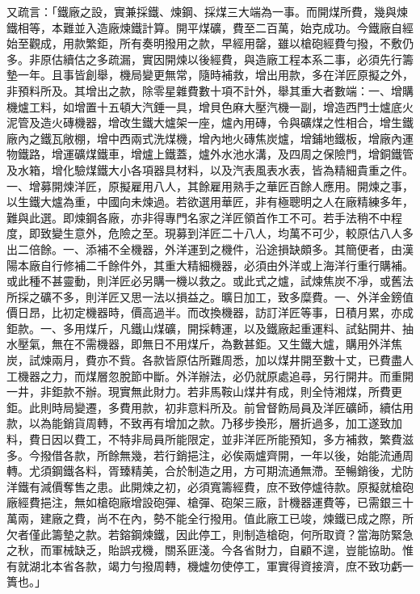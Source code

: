 \begin{pinyinscope}
又疏言：「鐵廠之設，實兼採鐵、煉鋼、採煤三大端為一事。而開煤所費，幾與煉鐵相等，本難並入造廠煉鐵計算。開平煤礦，費至二百萬，始克成功。今鐵廠自經始至觀成，用款繁鉅，所有奏明撥用之款，早經用罄，雖以槍砲經費勻撥，不敷仍多。非原估續估之多疏漏，實因開煉以後經費，與造廠工程本系二事，必須先行籌墊一年。且事皆創舉，機局變更無常，隨時補救，增出用款，多在洋匠原擬之外，非預料所及。其增出之款，除零星雜費數十項不計外，舉其重大者數端：一、增購機爐工料，如增置十五頓大汽錘一具，增貝色麻大壓汽機一副，增造西門士爐底火泥管及造火磚機器，增改生鐵大爐架一座，爐內用磚，令與礦煤之性相合，增生鐵廠內之鐵瓦敞棚，增中西兩式洗煤機，增內地火磚焦炭爐，增鋪地鐵板，增廠內運物鐵路，增運礦煤鐵車，增爐上鐵蓋，爐外水池水溝，及四周之保險門，增銅鐵管及水箱，增化驗煤鐵大小各項器具材料，以及汽表風表水表，皆為精細貴重之件。一、增募開煉洋匠，原擬雇用八人，其餘雇用熟手之華匠百餘人應用。開煉之事，以生鐵大爐為重，中國向未煉過。若欲選用華匠，非有極聰明之人在廠精練多年，難與此選。即煉鋼各廠，亦非得專門名家之洋匠領首作工不可。若手法稍不中程度，即致變生意外，危險之至。現募到洋匠二十八人，均萬不可少，較原估八人多出二倍餘。一、添補不全機器，外洋運到之機件，沿途損缺頗多。其簡便者，由漢陽本廠自行修補二千餘件外，其重大精細機器，必須由外洋或上海洋行重行購補。或此種不甚靈動，則洋匠必另購一機以救之。或此式之爐，試煉焦炭不凈，或舊法所採之礦不多，則洋匠又思一法以損益之。曠日加工，致多糜費。一、外洋金鎊值價日昂，比初定機器時，價高過半。而改換機器，訪訂洋匠等事，日積月累，亦成鉅款。一、多用煤斤，凡鐵山煤礦，開採轉運，以及鐵廠起重運料、試鉆開井、抽水壓氣，無在不需機器，即無日不用煤斤，為數甚鉅。又生鐵大爐，購用外洋焦炭，試煉兩月，費亦不貲。各款皆原估所難周悉，加以煤井開至數十丈，已費盡人工機器之力，而煤層忽脫節中斷。外洋辦法，必仍就原處追尋，另行開井。而重開一井，非鉅款不辦。現實無此財力。若非馬鞍山煤井有成，則全恃湘煤，所費更鉅。此則時局變遷，多費用款，初非意料所及。前曾督飭局員及洋匠礦師，續估用款，以為能銷貨周轉，不致再有增加之款。乃移步換形，層折過多，加工遂致加料，費日因以費工，不特非局員所能限定，並非洋匠所能預知，多方補救，繁費滋多。今撥借各款，所餘無幾，若行銷挹注，必俟兩爐齊開，一年以後，始能流通周轉。尤須鋼鐵各料，胥臻精美，合於制造之用，方可期流通無滯。至暢銷後，尤防洋鐵有減價奪售之患。此開煉之初，必須寬籌經費，庶不致停爐待款。原擬就槍砲廠經費挹注，無如槍砲廠增設砲彈、槍彈、砲架三廠，計機器運費等，已需銀三十萬兩，建廠之費，尚不在內，勢不能全行撥用。值此廠工已竣，煉鐵已成之際，所欠者僅此籌墊之款。若鎔鋼煉鐵，因此停工，則制造槍砲，何所取資？當海防緊急之秋，而軍械缺乏，貽誤戎機，關系匪淺。今各省財力，自顧不遑，豈能協助。惟有就湖北本省各款，竭力勻撥周轉，機爐勿使停工，軍實得資接濟，庶不致功虧一簣也。」


\end{pinyinscope}

